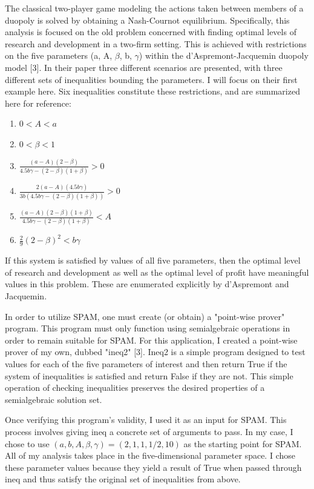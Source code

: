 \documentclass{article}
\begin{document}
The classical two-player game modeling the actions taken between members of a duopoly is solved by obtaining a Nash-Cournot equilibrium. Specifically, this analysis is focused on the old problem concerned with finding optimal levels of research and development in a two-firm setting. This is achieved with restrictions on the five parameters (a, A, $\beta$, b, $\gamma$) within the d'Aspremont-Jacquemin duopoly model [3]. In their paper three different scenarios are presented, with three different sets of inequalities bounding the parameters. I will focus on their first example here. Six inequalities constitute these restrictions, and are summarized here for reference:
\begin{enumerate}
\item$0 < A < a$
\item$0 < \beta < 1$
\item$\frac{(a - A)(2 - \beta)}{4.5b\gamma - (2-\beta)(1+\beta)} > 0$
\item$\frac{2(a-A)(4.5b\gamma)}{3b(4.5b\gamma-(2-\beta)(1+\beta))}>0$
\item$\frac{(a-A)(2-\beta)(1+\beta)}{4.5b\gamma-(2-\beta)(1+\beta)}<A$
\item$\frac{2}{9}(2-\beta)^{2}<b\gamma$
\end{enumerate}

If this system is satisfied by values of all five parameters, then the optimal level of research and development as well as the optimal level of profit have meaningful values in this problem. These are enumerated explicitly by d'Aspremont and Jacquemin.

In order to utilize SPAM, one must create (or obtain) a "point-wise prover" program. This program must only function using semialgebraic operations in order to remain suitable for SPAM. For this application, I created a point-wise prover of my own, dubbed "ineq2" [3]. Ineq2 is a simple program designed to test values for each of the five parameters of interest and then return True if the system of inequalities is satisfied and return False if they are not. This simple operation of checking inequalities preserves the desired properties of a semialgebraic solution set.

Once verifying this program's validity, I used it as an input for SPAM. This process involves giving ineq a concrete set of arguments to pass. In my case, I chose to use $(a, b, A, \beta, \gamma)=(2, 1, 1, 1/2, 10)$ as the starting point for SPAM. All of my analysis takes place in the five-dimensional parameter space. I chose these parameter values because they yield a result of True when passed through ineq and thus satisfy the original set of inequalities from above.
\end{document}
